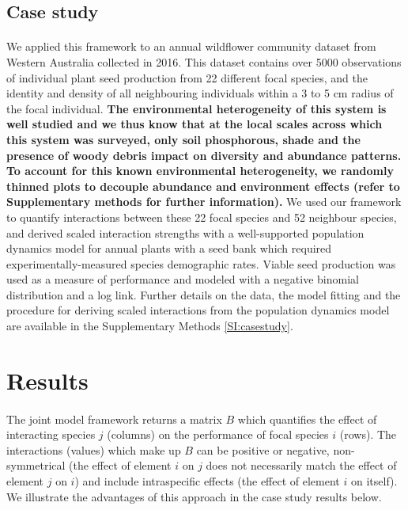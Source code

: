 \documentclass[a4,12pt]{article}
\begin{document}
\begin{refsection}
    \subsection{Case study}

       \paragraph{}
        We applied this framework to an annual wildflower community dataset from Western Australia collected in 2016. This dataset contains over 5000 observations of individual plant seed production from 22 different focal species, and the identity and density of all neighbouring individuals within a 3 to 5 cm radius of the focal individual. \textbf{The environmental heterogeneity of this system is well studied \parencite{Dwyer2015} and we thus know that at the local scales across which this system was surveyed, only soil phosphorous, shade and the presence of woody debris impact on diversity and abundance patterns. To account for this known environmental heterogeneity, we randomly thinned plots to decouple abundance and environment effects (refer to Supplementary methods for further information).} We used our framework to quantify interactions between these 22 focal species and 52 neighbour species, and derived scaled interaction strengths with a well-supported population dynamics model for annual plants with a seed bank \parencite{Levine2009, Bimler2018} which required experimentally-measured species demographic rates. Viable seed production was used as a measure of performance and modeled with a negative binomial distribution and a log link. Further details on the data, the model fitting and the procedure for deriving scaled interactions from the population dynamics model are available in the Supplementary Methods \ref{SI:casestudy}.


\section{Results}
    
    \paragraph{}
    The joint model framework returns a matrix $B$ which quantifies the effect of interacting species $j$ (columns) on the performance of focal species $i$ (rows). The interactions (values) which make up $B$ can be positive or negative, non-symmetrical (the effect of element $i$ on $j$ does not necessarily match the effect of element $j$ on $i$) and include intraspecific effects (the effect of element $i$ on itself). We illustrate the advantages of this approach in the case study results below. 



\end{refsection}
\end{document}
